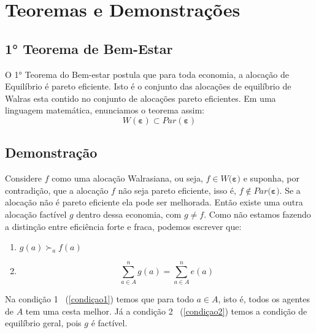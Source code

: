 \documentclass[12pt,a4paper]{article}
\begin{document}
\section{Teoremas e Demonstrações}
\subsection{1° Teorema de Bem-Estar}
O 1° Teorema do Bem-estar postula que para toda economia, a alocação de Equilíbrio é pareto eficiente. Isto é o conjunto das alocações de equilíbrio de Walras esta contido no conjunto de alocações pareto eficientes. Em uma linguagem matemática, enunciamos o teorema assim: 
\begin{equation}
    W(\boldsymbol{\varepsilon}) \subset Par(\boldsymbol{\varepsilon})
\end{equation}
\subsection{Demonstração}
Considere $f$ como uma alocação Walrasiana, ou seja, $f \in W(\boldsymbol{\varepsilon)}$ e suponha, por contradição, que a alocação $f$ não seja pareto eficiente, isso é, $f \notin Par(\boldsymbol{\varepsilon)}$.
Se a alocação não é pareto eficiente ela pode ser melhorada. Então existe uma outra alocação factível $g$ dentro dessa economia, com $g \neq f$.
Como não estamos fazendo a distinção entre eficiência forte e fraca, podemos escrever que:
\begin{enumerate}
    \item $g(a) \succ_a f(a)$ \label{condiçao1}
    \item \begin{equation}
        \sum_{a \in A}^{n} g(a) = \sum_{a \in A}^{n} e(a)
        \label{condiçao2}
    \end{equation}
\end{enumerate}
Na condição 1 ~(\ref{condiçao1}) temos que para todo $a \in A$, isto é, todos os agentes de $A$ tem uma cesta melhor. Já a condição 2 ~(\ref{condiçao2}) temos a condição de equilíbrio geral, pois $g$ é factível.
\end{document}
